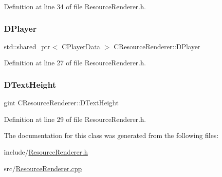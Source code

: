 Definition at line 34 of file Resource\+Renderer.\+h.

\hypertarget{classCResourceRenderer_ad8479113a1d9b1ab1a134ca86bc823e0}{}\label{classCResourceRenderer_ad8479113a1d9b1ab1a134ca86bc823e0} 
\subsubsection{\texorpdfstring{D\+Player}{DPlayer}}
{\footnotesize\ttfamily std\+::shared\+\_\+ptr$<$ \hyperlink{classCPlayerData}{C\+Player\+Data} $>$ C\+Resource\+Renderer\+::\+D\+Player\hspace{0.3cm}{\ttfamily [protected]}}



Definition at line 27 of file Resource\+Renderer.\+h.

\hypertarget{classCResourceRenderer_a7674293a7af59bfc3a75f57e729d9a6f}{}\label{classCResourceRenderer_a7674293a7af59bfc3a75f57e729d9a6f} 
\subsubsection{\texorpdfstring{D\+Text\+Height}{DTextHeight}}
{\footnotesize\ttfamily gint C\+Resource\+Renderer\+::\+D\+Text\+Height\hspace{0.3cm}{\ttfamily [protected]}}



Definition at line 29 of file Resource\+Renderer.\+h.



The documentation for this class was generated from the following files\+:\begin{DoxyCompactItemize}
\item 
include/\hyperlink{ResourceRenderer_8h}{Resource\+Renderer.\+h}\item 
src/\hyperlink{ResourceRenderer_8cpp}{Resource\+Renderer.\+cpp}\end{DoxyCompactItemize}
